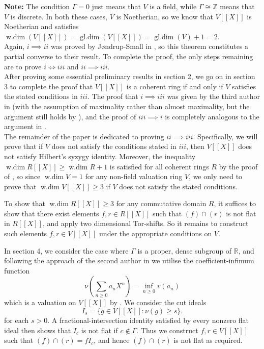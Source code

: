 \documentclass[12pt]{amsart}
\theoremstyle{plain}
\newcommand{\wdim}{\operatorname{w.dim}}
\newcommand{\gdim}{\operatorname{gl.dim}}
\begin{document}
\noindent\textbf{Note:} The condition $\Gamma=0$ just means that $V$ is a field, while $\Gamma\cong\mathbb{Z}$ means that $V$ is discrete. In both these cases, $V$ is Noetherian, so we know that $V[[X]]$ is Noetherian and satisfies $\wdim(V[[X]])=\gdim(V[[X]])=\gdim(V)+1=2$.\\

\noindent Again, $i \implies ii$ was proved by  J{\o}ndrup-Small in \cite[Lemma 1]{JondrupSmall}, so this theorem constitutes a partial converse to their result. To complete the proof, the only steps remaining are to prove $i\iff iii$ and $ii\implies iii$.\\

\noindent After proving some essential preliminary results in section 2, we go on in section 3 to complete the proof that $V[[X]]$ is a coherent ring if and only if $V$ satisfies the stated conditions in $iii$. The proof that $i\implies iii$ was given by the third author in \cite[Section 5]{Wang} (with the assumption of maximality rather than almost maximality, but the argument still holds by \cite[Remark 4.3]{Wang}), and the proof of $iii\implies i$ is completely analogous to the argument in \cite[Section 3]{Wang}. \\

\noindent The remainder of the paper is dedicated to proving $ii\implies iii$. Specifically, we will prove that if $V$ does not satisfy the conditions stated in $iii$, then $V[[X]]$ does not satisfy Hilbert's syzygy identity. Moreover, the inequality $\wdim R[[X]]\geq\wdim R+1$ is satisfied for all coherent rings $R$ by the proof of \cite[Lemma 1.1]{JondrupSmall}, so since $\wdim V=1$ for any non-field valuation ring $V$, we only need to prove that $\wdim V[[X]]\geq 3$ if $V$ does not satisfy the stated conditions.


To show that $\wdim R[[X]]\geq 3$ for any commutative domain $R$, it suffices to show that there exist elements $f,r\in R[[X]]$ such that $(f)\cap (r)$ is not flat in $R[[X]]$, and apply two dimensional Tor-shifts. So it remains to construct such elements $f,r\in V[[X]]$ under the appropriate conditions on $V$.

In section 4, we consider the case where $\Gamma$ is a proper, dense subgroup of $\mathbb{R}$, and following the approach of the second author in \cite{Jones} we utilise the coefficient-infimum function
\begin{equation}\label{eq:intro-valuation}
  \nu\!\left(\sum_{n\geq0}a_nX^n\right)
  =\inf_{n\geq0}v(a_n)
\end{equation}
which is a valuation on $V[[X]]$ by \cite[Corollary~2.5]{Jones}. We consider the cut ideals
\[
  I_s=\{g\in V[[X]]:\nu(g)\geq s\}.
\]
for each $s>0$. A fractional-intersection identity satisfied by every nonzero flat ideal then shows that $I_c$ is not flat if $c\notin\Gamma$. Thus we construct $f,r\in V[[X]]$ such that $(f)\cap(r)=fI_c$, and hence $(f)\cap (r)$ is not flat as required.
\end{document}
